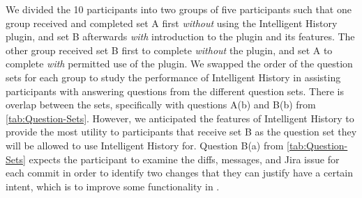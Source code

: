 We divided the 10 participants into two groups of five participants such that one group received and completed set A first \emph{without} using the Intelligent History plugin, and set B afterwards \emph{with} introduction to the plugin and its features.
The other group received set B first to complete \emph{without} the plugin, and set A to complete \emph{with} permitted use of the plugin.
We swapped the order of the question sets for each group to study the performance of Intelligent History in assisting participants with answering questions from the different question sets.
There is overlap between the sets, specifically with questions A(b) and B(b) from \autoref{tab:Question-Sets}.
However, we anticipated the features of Intelligent History to provide the most utility to participants that receive set B as the question set they will be allowed to use Intelligent History for.
Question B(a) from \autoref{tab:Question-Sets} expects the participant to examine the diffs, messages, and Jira issue for each commit in order to identify two changes that they can justify have a certain intent, which is to improve some functionality in . 

